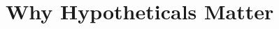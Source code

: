
\chapter[Hypotheticals Matter]{Why Hypotheticals Matter} \label{chap:hypotheticals-matter}


%
%
%
%

